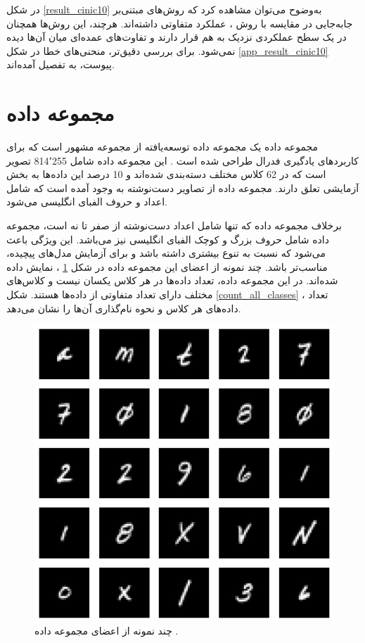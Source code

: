 در شکل
\ref{result_cinic10}
به‌وضوح می‌توان مشاهده کرد که روش‌های مبتنی‌بر جابه‌جایی در مقایسه با روش
%
، عملکرد متفاوتی داشته‌اند. هرچند، این روش‌ها همچنان در یک سطح عملکردی نزدیک به هم قرار دارند و تفاوت‌های عمده‌ای میان آن‌ها دیده نمی‌شود. برای بررسی دقیق‌تر، منحنی‌های خطا در شکل
\ref{app_result_cinic10}
پیوست، به تفصیل آمده‌اند.




\section{
	مجموعه داده
}



مجموعه داده
یک مجموعه داده توسعه‌یافته از مجموعه مشهور
است که برای کاربردهای یادگیری فدرال طراحی شده است
\cite{caldas2018leaf}.
این مجموعه داده شامل 814٬255 تصویر است که در 62 کلاس مختلف دسته‌بندی شده‌اند و 10 درصد این داده‌ها به بخش آزمایشی تعلق دارند. مجموعه داده
از تصاویر دست‌نوشته به وجود آمده است که شامل اعداد و حروف الفبای انگلیسی می‌شود.

برخلاف مجموعه داده
که تنها شامل اعداد دست‌نوشته از صفر تا نه است، مجموعه داده
شامل حروف بزرگ و کوچک الفبای انگلیسی نیز می‌باشد. این ویژگی باعث می‌شود که
نسبت به
تنوع بیشتری داشته باشد و برای آزمایش مدل‌های پیچیده‌، مناسب‌تر باشد.
چند نمونه از اعضای این مجموعه داده در شکل
\ref{femnist}%
، نمایش داده شده‌اند.
در این مجموعه داده، تعداد داده‌ها در هر کلاس یکسان نیست و کلاس‌های مختلف دارای تعداد متفاوتی از داده‌ها هستند. شکل
\ref{count_all_classes}%
، تعداد داده‌های هر کلاس و نحوه نام‌گذاری آن‌ها را نشان می‌دهد.


\begin{figure}[b!]
	\centering
	\includegraphics[scale=0.5]{images/chap5/femnist.png}%
	\caption{%
		چند نمونه از اعضای مجموعه داده
		\cite{holzer2023dynamically}.
	}
	\label{femnist}
	\centering
\end{figure}



